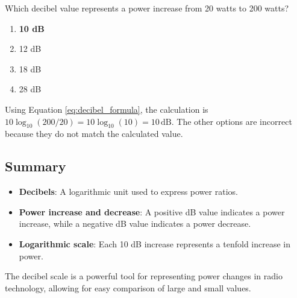 
\begin{tcolorbox}[colback=gray!10!white,colframe=black!75!black,title={T5B11}]
    Which decibel value represents a power increase from 20 watts to 200 watts?
    \begin{enumerate}[label=\Alph*,noitemsep]
        \item \textbf{10 dB}
        \item 12 dB
        \item 18 dB
        \item 28 dB
    \end{enumerate}
\end{tcolorbox}
Using Equation \ref{eq:decibel_formula}, the calculation is \( 10 \log_{10}(200/20) = 10 \log_{10}(10) = 10 \, \text{dB} \). The other options are incorrect because they do not match the calculated value.


\subsection*{Summary}
\begin{itemize}
    \item \textbf{Decibels}: A logarithmic unit used to express power ratios.
    \item \textbf{Power increase and decrease}: A positive dB value indicates a power increase, while a negative dB value indicates a power decrease.
    \item \textbf{Logarithmic scale}: Each 10 dB increase represents a tenfold increase in power.
\end{itemize}
The decibel scale is a powerful tool for representing power changes in radio technology, allowing for easy comparison of large and small values.
